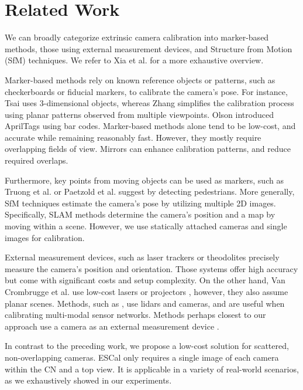 \section{Related Work} 
\label{sec:related_work}

We can broadly categorize extrinsic camera calibration into 
marker-based methods, those using external measurement devices, and 
Structure from Motion (SfM) techniques. We refer to 
Xia et al. \cite{xia2018global} for a more exhaustive overview.

Marker-based methods rely on known reference objects or patterns, such as 
checkerboards or fiducial markers, to calibrate the camera's pose. 
For instance, Tsai \cite{tsai1987} uses 3-dimensional objects, 
whereas Zhang \cite{zhang2000}
simplifies the calibration process using planar patterns observed from 
multiple viewpoints. Olson \cite{olson2011apriltag} introduced AprilTags 
using bar codes. Marker-based methods alone tend to be low-cost, 
and accurate while 
remaining reasonably fast. However, they mostly require overlapping fields 
of view. Mirrors \cite{raposo2017extrinsic, fuu2016automatic} can 
enhance calibration patterns, and reduce required overlaps.

Furthermore, key points from moving objects can be 
used as markers, such as Truong et al. \cite{truong2019automatic} or 
Paetzold et al. \cite{patzold2022online} suggest by detecting pedestrians.
More generally, SfM \cite{tripicchio2022multi, xu2021wide} techniques estimate 
the camera's pose by utilizing multiple 2D images. Specifically, SLAM methods 
\cite{carrera2011slam, sola2008} determine the camera's position and a map by 
moving within a scene. However, we use statically attached cameras and 
single images for calibration.

External measurement devices, such as laser trackers \cite{cheng2015} or 
theodolites \cite{lu2004global} precisely measure the camera's 
position and orientation. Those systems 
offer high accuracy but come with significant costs and setup complexity. 
On the other hand, Van Crombrugge et al. \cite{van2021extrinsic} use 
low-cost lasers or projectors \cite{van2020extrinsic}, however, they also 
assume planar scenes. Methods, such as \cite{liu2022targetless}, use lidars 
and cameras, and are useful when calibrating multi-modal sensor networks. 
Methods perhaps closest to our approach use a camera as an 
external measurement device \cite{miyata2018}. 

In contrast to the preceding work, we propose a low-cost
solution for scattered, non-overlapping cameras. ESCal only
requires a single image of each camera within the CN and a
top view. It is applicable in a variety of real-world scenarios, as we 
exhaustively showed in our experiments.


